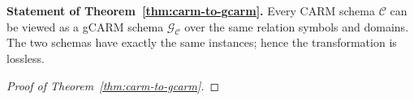 \documentclass[10pt]{article}
\begin{document}
\noindent\textbf{Statement of Theorem~\ref{thm:carm-to-gcarm}.}
Every \textsf{CARM} schema $\mathcal C$ can be viewed as a
\textsf{gCARM} schema $\mathcal G_{\mathcal C}$ over the same relation
symbols and domains.  The two schemas have exactly the same instances;
hence the transformation is lossless.

\begin{proof}[Proof of Theorem~\ref{thm:carm-to-gcarm}]
%
%
%
\end{proof}




\end{document}
